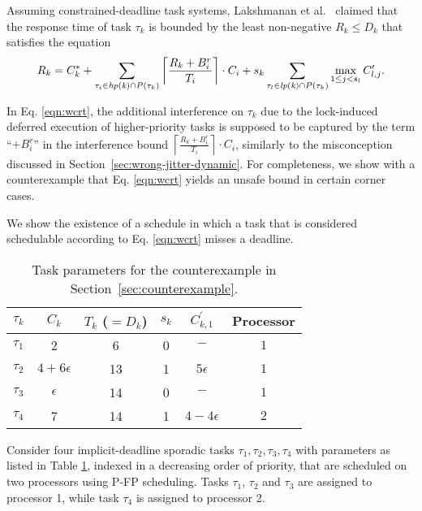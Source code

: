 Assuming constrained-deadline task systems, Lakshmanan et al.~\cite{lakshmanan-2009} claimed that the response time of task $\tau_k$ is bounded by the least non-negative $R_k \leq D_k$ that satisfies the equation
\begin{equation}
\label{eqn:wcrt}
R_k = C_k^{\ast} + \sum_{\tau_i \in \mathit{hp(k)} \cap P(\tau_k)} \left \lceil \frac{R_k + B_i^r}{T_i} \right \rceil \cdot C_i + s_k \sum_{\tau_l \in \mathit{lp(k)} \cap P(\tau_k)} \max_{1 \leq j < s_l} C_{l,j}^{\prime}.
\end{equation}



In Eq. \eqref{eqn:wcrt}, the additional interference on $\tau_k$ due to the lock-induced deferred execution of higher-priority tasks is supposed to be captured by the term ``$+ B^r_i$'' in the interference bound  $\left \lceil \frac{R_k + B_i^r}{T_i} \right \rceil \cdot C_i$,  similarly to the misconception discussed in Section~\ref{sec:wrong-jitter-dynamic}. For completeness, we show with a counterexample that Eq. \eqref{eqn:wcrt} yields an unsafe bound in certain corner cases.

\label{sec:counterexample}

We show the existence of a schedule in which a task that is considered schedulable according to Eq. \eqref{eqn:wcrt} misses a deadline.

%

\begin{table}[t]
\centering
    \begin{tabular}{|c|c|c|c|c|c|} 
 \hline
        $\tau_k$ & $C_k$ & $T_k$ ($= D_k$) & $s_k$ & $C_{k,1}^{\prime}$ & Processor\\
        \hline
        $\tau_1$ & 2             & 6  & 0 & $-$ & $1$\\ 
        $\tau_2$ & $4+6\epsilon$ & 13 & 1 & $5\epsilon$& $1$\\
        $\tau_3$ & $\epsilon$    & 14 & 0 & $-$ & $1$\\
        $\tau_4$ & 7             & 14 & 1 & $4-4\epsilon$ & $2$\\ 
        \hline
    \end{tabular}
    \caption{Task parameters for the counterexample in Section~\ref{sec:counterexample}.}
    \label{table:parameters}
\end{table}

Consider four implicit-deadline sporadic tasks ${\tau_1, \tau_2, \tau_3, \tau_4}$ with parameters as listed in Table \ref{table:parameters}, indexed in a decreasing order of priority, that are scheduled on two processors using P-FP scheduling. Tasks $\tau_1$, $\tau_2$ and $\tau_3$ are assigned to processor 1, while task $\tau_4$ is assigned to processor 2.

